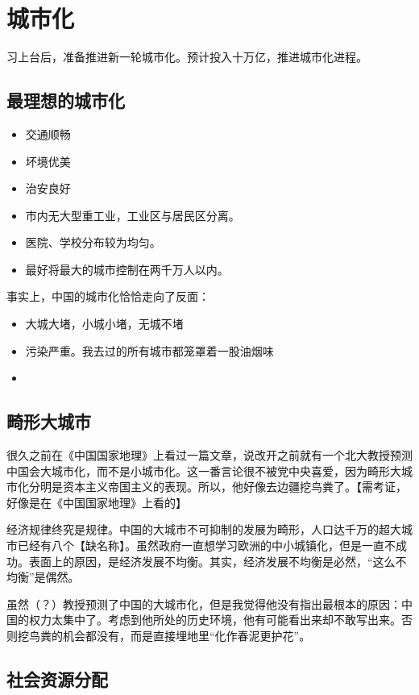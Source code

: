 \chapter{城市化}
\begin{quoting}
习上台后，准备推进新一轮城市化。预计投入十万亿，推进城市化进程。
\end{quoting}

\section{最理想的城市化}

\begin{itemize}
\item 交通顺畅
\item 坏境优美
\item 治安良好
\item 市内无大型重工业，工业区与居民区分离。
\item 医院、学校分布较为均匀。
\item 最好将最大的城市控制在两千万人以内。
\end{itemize}

事实上，中国的城市化恰恰走向了反面：
\begin{itemize}
\item 大城大堵，小城小堵，无城不堵
\item 污染严重。我去过的所有城市都笼罩着一股油烟味
\item 
\end{itemize}

\section{畸形大城市}
很久之前在《中国国家地理》上看过一篇文章，说改开之前就有一个北大教授预测中国会大城市化，而不是小城市化。这一番言论很不被党中央喜爱，因为畸形大城市化分明是资本主义帝国主义的表现。所以，他好像去边疆挖鸟粪了。【需考证，好像是在《中国国家地理》上看的】

经济规律终究是规律。中国的大城市不可抑制的发展为畸形，人口达千万的超大城市已经有八个【缺名称】。虽然政府一直想学习欧洲的中小城镇化，但是一直不成功。表面上的原因，是经济发展不均衡。其实，经济发展不均衡是必然，“这么不均衡”是偶然。

虽然（？）教授预测了中国的大城市化，但是我觉得他没有指出最根本的原因：中国的权力太集中了。考虑到他所处的历史环境，他有可能看出来却不敢写出来。否则挖鸟粪的机会都没有，而是直接埋地里“化作春泥更护花”。

\section{社会资源分配}

